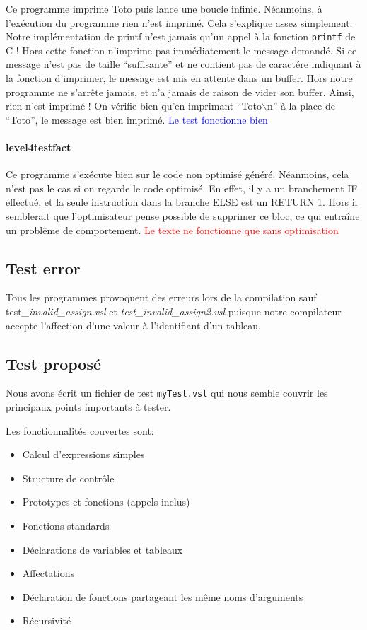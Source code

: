 \documentclass{article}
\begin{document}
Ce programme imprime Toto puis lance une boucle infinie. Néanmoins, à
l'exécution du programme rien n'est imprimé. Cela s'explique assez simplement:
Notre implémentation de printf n'est jamais qu'un appel à la fonction
\texttt{printf} de C ! Hors cette fonction n'imprime pas immédiatement le message
demandé. Si ce message n'est pas de taille ``suffisante'' et ne contient pas de
caractére indiquant à la fonction d'imprimer, le message est mis en attente dans
un buffer. Hors notre programme ne s'arrête jamais, et n'a jamais de raison de
vider son buffer. Ainsi, rien n'est imprimé ! On vérifie bien qu'en imprimant
``Toto$\backslash$n'' à la place de ``Toto'', le message est bien imprimé. \textcolor{blue}{Le
  test fonctionne bien}

\paragraph{level4testfact}

Ce programme s'exécute bien sur le code non optimisé généré. Néanmoins, cela
n'est pas le cas si on regarde le code optimisé. En effet, il y a un branchement
IF effectué, et la seule instruction dans la branche ELSE est un RETURN 1. Hors
il semblerait que l'optimisateur pense possible de supprimer ce bloc, ce qui
entraîne un problême de comportement. \textcolor{red}{Le texte ne fonctionne que sans optimisation}

\subsection{Test error}

Tous les programmes provoquent des erreurs lors de la compilation sauf test\textit{\_invalid\_assign.vsl} et \textit{test\_invalid\_assign2.vsl}  puisque notre compilateur accepte l'affection d'une valeur à l'identifiant d'un tableau.

\subsection{Test proposé}

Nous avons écrit un fichier de test \texttt{myTest.vsl} qui nous
semble couvrir les principaux points importants à tester.

Les fonctionnalités couvertes sont:
\begin{itemize}
\item Calcul d'expressions simples
\item Structure de contrôle
\item Prototypes et fonctions (appels inclus)
\item Fonctions standards
\item Déclarations de variables et tableaux
\item Affectations
\item Déclaration de fonctions partageant les même noms d'arguments
\item Récursivité
\end{itemize}
\end{document}
